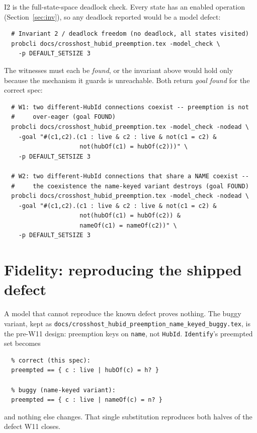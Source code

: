 \documentclass[a4paper,10pt,fleqn]{article}
\begin{document}
I2 is the full-state-space deadlock check.  Every state has an enabled
operation (Section~\ref{sec:inv}), so any deadlock reported would be a
model defect:
\begin{verbatim}
  # Invariant 2 / deadlock freedom (no deadlock, all states visited)
  probcli docs/crosshost_hubid_preemption.tex -model_check \
    -p DEFAULT_SETSIZE 3
\end{verbatim}

The witnesses must each be \emph{found}, or the invariant above would
hold only because the mechanism it guards is unreachable.  Both return
\emph{goal found} for the correct spec:
\begin{verbatim}
  # W1: two different-HubId connections coexist -- preemption is not
  #     over-eager (goal FOUND)
  probcli docs/crosshost_hubid_preemption.tex -model_check -nodead \
    -goal "#(c1,c2).(c1 : live & c2 : live & not(c1 = c2) &
                     not(hubOf(c1) = hubOf(c2)))" \
    -p DEFAULT_SETSIZE 3

  # W2: two different-HubId connections that share a NAME coexist --
  #     the coexistence the name-keyed variant destroys (goal FOUND)
  probcli docs/crosshost_hubid_preemption.tex -model_check -nodead \
    -goal "#(c1,c2).(c1 : live & c2 : live & not(c1 = c2) &
                     not(hubOf(c1) = hubOf(c2)) &
                     nameOf(c1) = nameOf(c2))" \
    -p DEFAULT_SETSIZE 3
\end{verbatim}

\section{Fidelity: reproducing the shipped defect}
\label{sec:fidelity}

A model that cannot reproduce the known defect proves nothing.  The buggy
variant, kept as
\texttt{docs/crosshost\_hubid\_preemption\_name\_keyed\_buggy.tex}, is the
pre-W11 design: preemption keys on \texttt{name}, not \texttt{HubId}.
\texttt{Identify}'s preempted set becomes
\begin{verbatim}
  % correct (this spec):
  preempted == { c : live | hubOf(c) = h? }

  % buggy (name-keyed variant):
  preempted == { c : live | nameOf(c) = n? }
\end{verbatim}
and nothing else changes.  That single substitution reproduces both
halves of the defect W11 closes.
\end{document}
